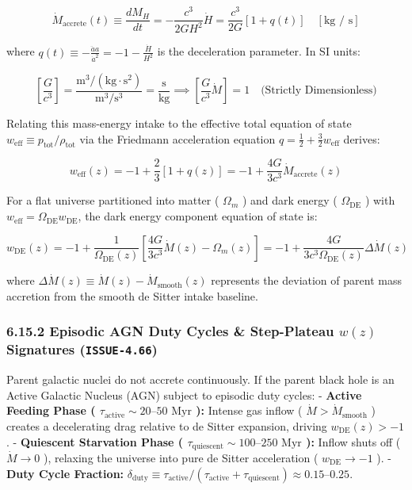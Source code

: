 \documentclass[11pt,a4paper]{article}
\theoremstyle{definition}
\theoremstyle{remark}
\begin{document}
\begin{equation}
\dot{M}_{\text{accrete}}(t) \equiv \frac{d M_H}{dt} = -\frac{c^3}{2 G H^2} \dot{H} = \frac{c^3}{2G} [1 + q(t)] \quad [\text{kg / s}]
\end{equation}


where $q(t) \equiv -\frac{\ddot{a} a}{\dot{a}^2} = -1 - \frac{\dot{H}}{H^2}$ is the deceleration parameter. In SI units:


\begin{equation}
\left[ \frac{G}{c^3} \right] = \frac{\text{m}^3 / (\text{kg} \cdot \text{s}^2)}{\text{m}^3 / \text{s}^3} = \frac{\text{s}}{\text{kg}} \implies \left[ \frac{G}{c^3} \dot{M} \right] = 1 \quad \text{(Strictly Dimensionless)}
\end{equation}


Relating this mass-energy intake to the effective total equation of state $w_{\text{eff}} \equiv p_{\text{tot}} / \rho_{\text{tot}}$ via the Friedmann acceleration equation $q = \frac{1}{2} + \frac{3}{2} w_{\text{eff}}$ derives:


\begin{equation}
\boxed{w_{\text{eff}}(z) = -1 + \frac{2}{3}[1 + q(z)] = -1 + \frac{4G}{3c^3} \dot{M}_{\text{accrete}}(z)}
\end{equation}


For a flat universe partitioned into matter ( $\Omega_m$ ) and dark energy ( $\Omega_{\text{DE}}$ ) with $w_{\text{eff}} = \Omega_{\text{DE}} w_{\text{DE}}$, the dark energy component equation of state is:


\begin{equation}
\boxed{w_{\text{DE}}(z) = -1 + \frac{1}{\Omega_{\text{DE}}(z)}\left[ \frac{4G}{3c^3}\dot{M}(z) - \Omega_m(z) \right] = -1 + \frac{4G}{3c^3 \Omega_{\text{DE}}(z)} \Delta\dot{M}(z)}
\end{equation}


where $\Delta\dot{M}(z) \equiv \dot{M}(z) - \dot{M}_{\text{smooth}}(z)$ represents the deviation of parent mass accretion from the smooth de Sitter intake baseline.

\subsubsection{6.15.2 Episodic AGN Duty Cycles \& Step-Plateau $w(z)$ Signatures (\texttt{ISSUE-4.66})}
Parent galactic nuclei do not accrete continuously. If the parent black hole is an Active Galactic Nucleus (AGN) subject to episodic duty cycles:
- \textbf{Active Feeding Phase ( $\tau_{\text{active}} \sim 20\text{--}50\text{ Myr}$ ):} Intense gas inflow ( $\dot{M} > \dot{M}_{\text{smooth}}$ ) creates a decelerating drag relative to de Sitter expansion, driving $w_{\text{DE}}(z) > -1$.
- \textbf{Quiescent Starvation Phase ( $\tau_{\text{quiescent}} \sim 100\text{--}250\text{ Myr}$ ):} Inflow shuts off ( $\dot{M} \to 0$ ), relaxing the universe into pure de Sitter acceleration ( $w_{\text{DE}} \to -1$ ).
- \textbf{Duty Cycle Fraction:} $\delta_{\text{duty}} \equiv \tau_{\text{active}} / (\tau_{\text{active}} + \tau_{\text{quiescent}}) \approx 0.15\text{--}0.25$.
\end{document}

